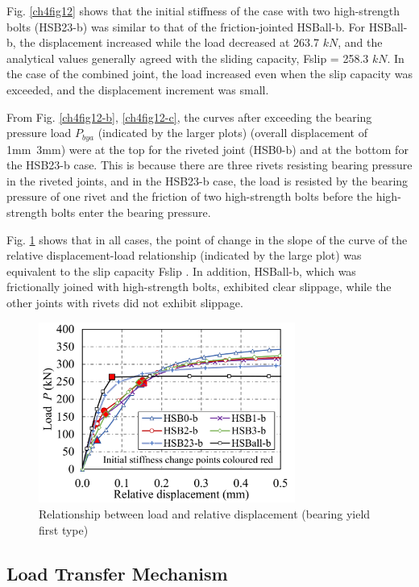 Fig. \ref{ch4fig12} shows that the initial stiffness of the case with two high-strength bolts (HSB23-b) was similar to that of the friction-jointed HSBall-b. For HSBall-b, the displacement increased while the load decreased at 263.7 $kN$, and the analytical values generally agreed with the sliding capacity, Fslip  = 258.3 $kN$. In the case of the combined joint, the load increased even when the slip capacity was exceeded, and the displacement increment was small.

From Fig. \ref{ch4fig12-b}, \ref{ch4fig12-c}, the curves after exceeding the bearing pressure load $P_{bya}$ (indicated by the larger plots) (overall displacement of 1mm~3mm) were at the top for the riveted joint (HSB0-b) and at the bottom for the HSB23-b case. This is because there are three rivets resisting bearing pressure in the riveted joints, and in the HSB23-b case, the load is resisted by the bearing pressure of one rivet and the friction of two high-strength bolts before the high-strength bolts enter the bearing pressure.

Fig. \ref{ch4fig14} shows that in all cases, the point of change in the slope of the curve of the relative displacement-load relationship (indicated by the large plot) was equivalent to the slip capacity Fslip . In addition, HSBall-b, which was frictionally joined with high-strength bolts, exhibited clear slippage, while the other joints with rivets did not exhibit slippage.

\begin{figure}
    \centering
    \includegraphics[width=0.75\textwidth]{imgs/ch4/fig14.pdf}
    \caption{Relationship between load and relative displacement (bearing yield first type)}
    \label{ch4fig14}
\end{figure}

\subsection{Load Transfer Mechanism}

